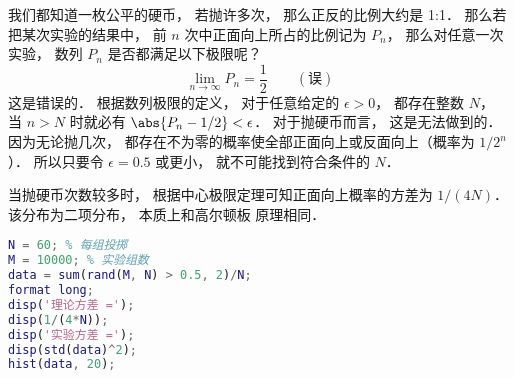 
\begin{issues}
\issueDraft
\end{issues}


我们都知道一枚公平的硬币， 若抛许多次， 那么正反的比例大约是 1:1． 那么若把某次实验的结果中， 前 $n$ 次中正面向上所占的比例记为 $P_n$， 那么对任意一次实验， 数列 $P_n$ 是否都满足以下极限呢？
\begin{equation}
\lim_{n\to\infty} P_n = \frac{1}{2} \qquad (\text{误})
\end{equation}
这是错误的． 根据数列极限的定义， 对于任意给定的 $\epsilon > 0$， 都存在整数 $N$， 当 $n>N$ 时就必有 $\abs{P_n -1/2} < \epsilon$． 对于抛硬币而言， 这是无法做到的． 因为无论抛几次， 都存在不为零的概率使全部正面向上或反面向上（概率为 $1/2^n$）． 所以只要令 $\epsilon = 0.5$ 或更小， 就不可能找到符合条件的 $N$．

当抛硬币次数较多时， 根据中心极限定理可知正面向上概率的方差为 $1/(4N)$． 该分布为二项分布， 本质上和高尔顿板 原理相同．

\begin{lstlisting}[language=matlab]
N = 60; % 每组投掷
M = 10000; % 实验组数
data = sum(rand(M, N) > 0.5, 2)/N;
format long;
disp('理论方差 =');
disp(1/(4*N));
disp('实验方差 =');
disp(std(data)^2);
hist(data, 20);
\end{lstlisting}
